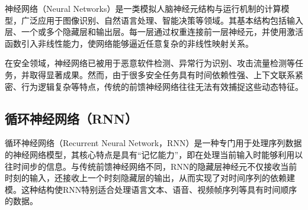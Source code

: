 神经网络（Neural Networks）是一类模拟人脑神经元结构与运行机制的计算模型，广泛应用于图像识别、自然语言处理、智能决策等领域。其基本结构包括输入层、一个或多个隐藏层和输出层。每一层通过权重连接前一层神经元，并使用激活函数引入非线性能力，使网络能够逼近任意复杂的非线性映射关系。




在安全领域，神经网络已被用于恶意软件检测、异常行为识别、攻击流量检测等任务，并取得显著成果。然而，由于很多安全任务具有时间依赖性强、上下文联系紧密、行为逻辑复杂等特点，传统的前馈神经网络往往无法有效捕捉这些动态特征。


\subsection{循环神经网络（RNN）}

循环神经网络（Recurrent Neural Network，RNN）是一种专门用于处理序列数据的神经网络模型，其核心特点是具有“记忆能力”，即在处理当前输入时能够利用以往时间步的信息。与传统前馈神经网络不同，RNN的隐藏层神经元不仅接收当前时刻的输入，还接收上一个时刻隐藏层的输出，从而实现了对时间序列的依赖建模。这种结构使RNN特别适合处理语言文本、语音、视频帧序列等具有时间顺序的数据。

